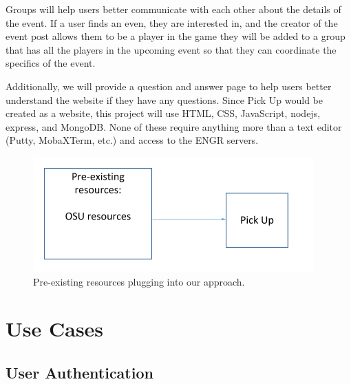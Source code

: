 \documentclass[a4paper]{article}
\begin{document}
Groups will help users better communicate with each other about the details of the event. If a user finds an even, they are interested in, and the creator of the event post allows them to be a player in the game they will be added to a group that has all the players in the upcoming event so that they can coordinate the specifics of the event.

Additionally, we will provide a question and answer page to help users better understand the website if they have any questions. Since Pick Up would be created as a website, this project will use HTML, CSS, JavaScript, nodejs, express, and MongoDB. None of these require anything more than a text editor (Putty, MobaXTerm, etc.) and access to the ENGR servers.

\begin{figure}
  \centering
		\includegraphics[width=.5\textwidth]{images/diagram.png}
	\caption{Pre-existing resources plugging into our approach.}
    \label{fig:diagram}
\end{figure}

\newpage

\section{Use Cases}

\subsection{User Authentication}
\end{document}
